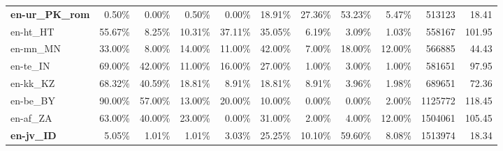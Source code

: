 \begin{table*}[hbt!]
{\begin{tabular}{l|rrrr|rrrr|rr}
            \textbf{en-ur\_PK\_rom} & 0.50\%  & 0.00\%  & 0.50\%  & 0.00\%  & 18.91\% & 27.36\% & 53.23\% & 5.47\%  & 513123      & 18.41             \\
            en-ht\_HT               & 55.67\% & 8.25\%  & 10.31\% & 37.11\% & 35.05\% & 6.19\%  & 3.09\%  & 1.03\%  & 558167      & 101.95            \\
            en-mn\_MN               & 33.00\% & 8.00\%  & 14.00\% & 11.00\% & 42.00\% & 7.00\%  & 18.00\% & 12.00\% & 566885      & 44.43             \\
            en-te\_IN               & 69.00\% & 42.00\% & 11.00\% & 16.00\% & 27.00\% & 1.00\%  & 3.00\%  & 1.00\%  & 581651      & 97.95             \\
            en-kk\_KZ               & 68.32\% & 40.59\% & 18.81\% & 8.91\%  & 18.81\% & 8.91\%  & 3.96\%  & 1.98\%  & 689651      & 72.36             \\
            en-be\_BY               & 90.00\% & 57.00\% & 13.00\% & 20.00\% & 10.00\% & 0.00\%  & 0.00\%  & 2.00\%  & 1125772     & 118.45            \\
            en-af\_ZA               & 63.00\% & 40.00\% & 23.00\% & 0.00\%  & 31.00\% & 2.00\%  & 4.00\%  & 12.00\% & 1504061     & 105.45            \\
            \textbf{en-jv\_ID}      & 5.05\%  & 1.01\%  & 1.01\%  & 3.03\%  & 25.25\% & 10.10\% & 59.60\% & 8.08\%  & 1513974     & 18.34             \\


\end{tabular}}
\end{table*}
